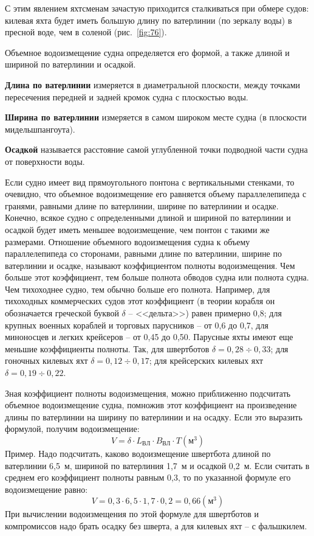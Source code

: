 \documentclass[a4paper, 12pt, twoside, final]{scrbook}
\begin{document}
С этим явлением яхтсменам зачастую приходится сталкиваться при обмере судов: килевая яхта будет иметь большую длину по ватерлинии (по зеркалу воды) в пресной воде, чем в соленой (рис.~\ref{fig:76}).

Объемное водоизмещение судна определяется его формой, а также длиной и шириной по ватерлинии и осадкой.

\textbf{Длина по ватерлинии} измеряется в диаметральной плоскости, между точками пересечения передней и задней кромок судна с плоскостью воды.

\textbf{Ширина по ватерлинии} измеряется в самом широком месте судна (в плоскости мидельшпангоута).

\textbf{Осадкой} называется расстояние самой углубленной точки подводной части судна от поверхности воды.

Если судно имеет вид прямоугольного понтона с вертикальными стенками, то очевидно, что объемное водоизмещение его равняется объему параллелепипеда с гранями, равными длине по ватерлинии, ширине по ватерлинии и осадке. Конечно, всякое судно с определенными длиной и шириной по ватерлинии и осадкой будет иметь меньшее водоизмещение, чем понтон с такими же размерами. Отношение объемного водоизмещения судна к объему параллелепипеда со сторонами, равными длине по ватерлинии, ширине по ватерлинии и осадке, называют коэффициентом полноты водоизмещения. Чем больше этот коэффициент, тем больше полнота обводов судна или полнота судна. Чем тихоходнее судно, тем обычно больше его полнота. Например, для тихоходных коммерческих судов этот коэффициент (в теории корабля он обозначается греческой буквой $\delta$ \--- <<дельта>>) равен примерно 0,8; для крупных военных кораблей и торговых парусников \--- от 0,6 до 0,7, для миноносцев и легких крейсеров \--- от 0,45 до 0,50. Парусные яхты имеют еще меньшие коэффициенты полноты. Так, для швертботов $\delta=0{,}28\div0{,}33$; для гоночных килевых яхт $\delta=0{,}12\div0{,}17$; для крейсерских килевых яхт $\delta=0{,}19\div0{,}22$.

Зная коэффициент полноты водоизмещения, можно приближенно подсчитать объемное водоизмещение судна, помножив этот коэффициент на произведение длины по ватерлинии на ширину по ватерлинии и на осадку. Если это выразить формулой, получим водоизмещение:
$$
V=\delta\cdot L_{ВЛ} \cdot B_{ВЛ} \cdot T ({м}^3)
$$
Пример. Надо подсчитать, каково водоизмещение швертбота длиной по ватерлинии 6,5~м, шириной по ватерлиния 1,7~м и осадкой 0,2~м. Если считать в среднем его коэффициент полноты равным 0,3, то по указанной формуле его водоизмещение равно:
$$
V=0{,}3 \cdot 6{,}5 \cdot 1{,}7 \cdot 0{,}2=0{,}66 ({м}^3)
$$
При вычислении водоизмещения по этой формуле для швертботов и компромиссов надо брать осадку без шверта, а для килевых яхт \--- с фальшкилем.
\end{document}
